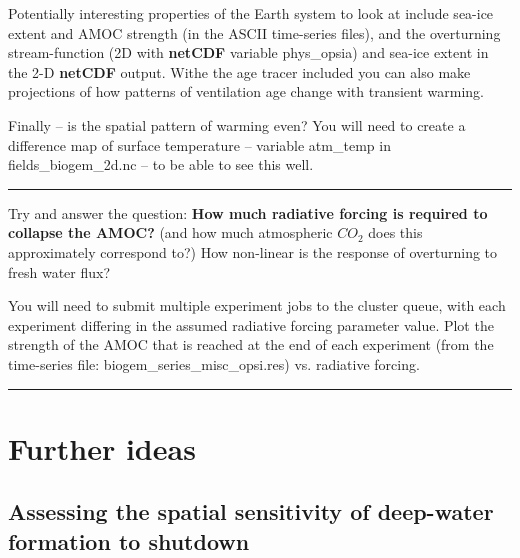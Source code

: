 Potentially interesting properties of the Earth system to look at include sea-ice extent and AMOC strength (in the ASCII time-series files), and the overturning stream-function (2D with \textbf{netCDF} variable \textsf{\footnotesize phys\_opsia}) and sea-ice extent in the 2-D \textbf{netCDF} output. Withe the age tracer included you can also make projections of how patterns of ventilation age change with transient warming.

Finally -- is the spatial pattern of warming even? You will need to create a difference map of surface temperature -- variable \textsf{\footnotesize atm\_temp} in \textsf{\footnotesize fields\_biogem\_2d.nc} -- to be able to see this well.

\vspace{1mm}\noindent\rule{4cm}{0.5pt}\vspace{2mm}

\noindent Try and answer the question: \textbf{How much radiative forcing is required to collapse the AMOC?} (and how much atmospheric \(CO_{2}\) does this approximately correspond to?) How non-linear is the response of overturning to fresh water flux?

You will need to submit multiple experiment jobs to the cluster queue, with each experiment differing in the assumed radiative forcing parameter value. Plot the strength of the AMOC that is reached at the end of each experiment (from the time-series file: \textsf{\footnotesize biogem\_series\_misc\_opsi.res}) vs. radiative forcing.

\vspace{1mm}\noindent\rule{4cm}{0.5pt}\vspace{2mm}

\newpage

\section{Further ideas}


\subsection{Assessing the spatial sensitivity of deep-water formation to shutdown}

